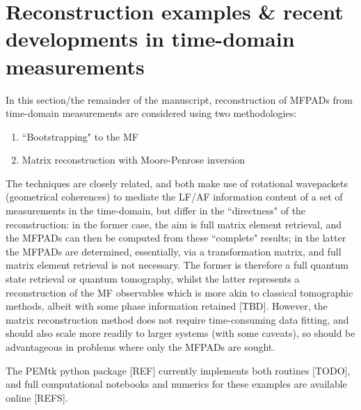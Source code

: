 \section{Reconstruction examples \& recent developments in time-domain measurements}

In this section/the remainder of the manuscript, reconstruction of MFPADs from time-domain measurements are considered using two methodologies:

\begin{enumerate}
\item ``Bootstrapping" to the MF \cite{hockett2018QMP1,hockett2018QMP2,marceau2017MolecularFrameReconstruction}
\item Matrix reconstruction with Moore-Penrose inversion \cite{gregory2021MolecularFramePhotoelectron}
\end{enumerate}

The techniques are closely related, and both make use of rotational wavepackets (geometrical coherences) to mediate the LF/AF information content of a set of measurements in the time-domain, but differ in the ``directness" of the reconstruction: in the former case, the aim is full matrix element retrieval, and the MFPADs can then be computed from these ``complete" results; in the latter the MFPADs are determined, essentially, via a transformation matrix, and full matrix element retrieval is not necessary. The former is therefore a full quantum state retrieval or quantum tomography, whilst the latter represents a reconstruction of the MF observables which is more akin to classical tomographic methods, albeit with some phase information retained [TBD]. However, the matrix reconstruction method does not require time-consuming data fitting, and should also scale more readily to larger systems (with some caveats), so should be advantageous in problems where only the MFPADs are sought.


The PEMtk python package [REF] currently implements both routines [TODO], and full computational notebooks and numerics for these examples are available online [REFS].